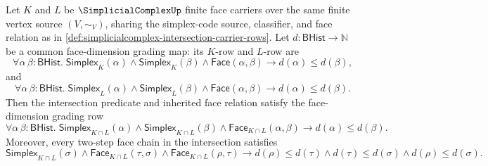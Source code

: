 \begin{theorem}
\label{thm:simplicialcomplex-intersection-inherits-face-dimension-grading}
Let $K$ and $L$ be $\SimplicialComplexUp$ finite face carriers over the same finite vertex source $(V,\sim_V)$, sharing the simplex-code source, classifier, and face relation as in \autoref{def:simplicialcomplex-intersection-carrier-rows}. Let $d:\mathsf{BHist}\to\mathbb{N}$ be a common face-dimension grading map: its $K$-row and $L$-row are
$$
\forall \alpha\,\beta:\mathsf{BHist}.\;
\mathsf{Simplex}_K(\alpha)\land
\mathsf{Simplex}_K(\beta)\land
\mathsf{Face}(\alpha,\beta)
\to
d(\alpha)\le d(\beta),
$$
and
$$
\forall \alpha\,\beta:\mathsf{BHist}.\;
\mathsf{Simplex}_L(\alpha)\land
\mathsf{Simplex}_L(\beta)\land
\mathsf{Face}(\alpha,\beta)
\to
d(\alpha)\le d(\beta).
$$
Then the intersection predicate and inherited face relation satisfy the face-dimension grading row
$$
\forall \alpha\,\beta:\mathsf{BHist}.\;
\mathsf{Simplex}_{K\cap L}(\alpha)\land
\mathsf{Simplex}_{K\cap L}(\beta)\land
\mathsf{Face}_{K\cap L}(\alpha,\beta)
\to
d(\alpha)\le d(\beta).
$$
Moreover, every two-step face chain in the intersection satisfies
$$
\mathsf{Simplex}_{K\cap L}(\sigma)
\land
\mathsf{Face}_{K\cap L}(\tau,\sigma)
\land
\mathsf{Face}_{K\cap L}(\rho,\tau)
\to
d(\rho)\le d(\tau)
\land
d(\tau)\le d(\sigma)
\land
d(\rho)\le d(\sigma).
$$
\end{theorem}
